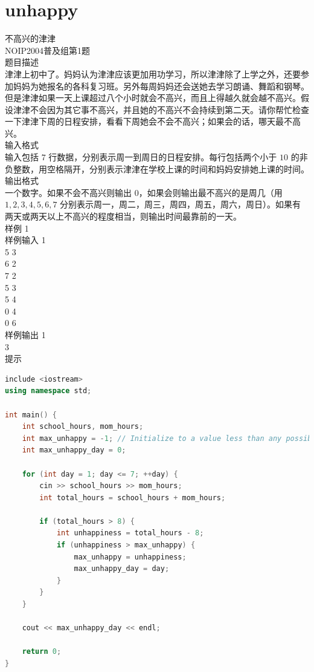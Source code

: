 \documentclass[12pt,twiside,a4paper]{ctexbook}
\numberwithin{chapter}{part}
\begin{document}
\section{unhappy}
不高兴的津津\\
NOIP2004普及组第1题\\
题目描述\\
津津上初中了。妈妈认为津津应该更加用功学习，所以津津除了上学之外，还要参加妈妈为她报名的各科复习班。另外每周妈妈还会送她去学习朗诵、舞蹈和钢琴。但是津津如果一天上课超过八个小时就会不高兴，而且上得越久就会越不高兴。假设津津不会因为其它事不高兴，并且她的不高兴不会持续到第二天。请你帮忙检查一下津津下周的日程安排，看看下周她会不会不高兴；如果会的话，哪天最不高兴。\\
 输入格式\\
输入包括 $7$ 行数据，分别表示周一到周日的日程安排。每行包括两个小于 $10$ 的非负整数，用空格隔开，分别表示津津在学校上课的时间和妈妈安排她上课的时间。\\
 输出格式\\
一个数字。如果不会不高兴则输出 $0$，如果会则输出最不高兴的是周几（用 $1, 2, 3, 4, 5, 6, 7$ 分别表示周一，周二，周三，周四，周五，周六，周日）。如果有两天或两天以上不高兴的程度相当，则输出时间最靠前的一天。\\
 样例 1\\
 样例输入 1\\
5 3\\
6 2\\
7 2\\
5 3\\
5 4\\
0 4\\
0 6\\
 样例输出 1\\
3\\
 提示\\
\begin{lstlisting}[language=C++,breaklines=true]
include <iostream>
using namespace std;

int main() {
    int school_hours, mom_hours;
    int max_unhappy = -1; // Initialize to a value less than any possible unhappiness
    int max_unhappy_day = 0;

    for (int day = 1; day <= 7; ++day) {
        cin >> school_hours >> mom_hours;
        int total_hours = school_hours + mom_hours;

        if (total_hours > 8) {
            int unhappiness = total_hours - 8;
            if (unhappiness > max_unhappy) {
                max_unhappy = unhappiness;
                max_unhappy_day = day;
            }
        }
    }

    cout << max_unhappy_day << endl;

    return 0;
}
\end{lstlisting}
\end{document}
